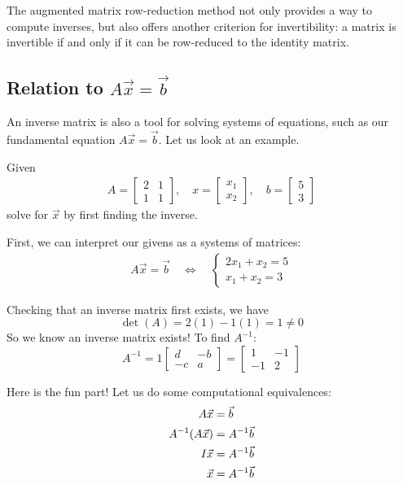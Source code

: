 The augmented matrix row-reduction method not only provides a way to compute inverses, but also offers another criterion for invertibility: 
a matrix is invertible if and only if it can be row-reduced to the identity matrix.
\subsection{Relation to $A\vec{x} = \vec{b}$}
An inverse matrix is also a tool for solving systems of equations, such as our fundamental equation $A\vec{x}=\vec{b}$. Let us look at an example.

Given
$$\begin{array}{c} A =
\begin{bmatrix}
2 & 1 \\
1 & 1
\end{bmatrix},
\quad
x =
\begin{bmatrix}
x_1 \\
x_2
\end{bmatrix},
\quad
b =
\begin{bmatrix}
5 \\
3
\end{bmatrix} \end{array}$$
solve for $\vec{x}$ by first finding the inverse.

First, we can interpret our givens as a systems of matrices:
$$\begin{array}{c} A \vec{x} = \vec{b}
\quad \Longleftrightarrow \quad
\begin{cases}
2x_1 + x_2 = 5 \\
x_1 + x_2 = 3
\end{cases} \end{array}$$

Checking that an inverse matrix first exists, we have
$$\det(A) = 2(1) - 1(1) = 1 \neq 0$$
So we know an inverse matrix exists! To find $A^{-1}$:
$$A^{-1} = 1\begin{bmatrix}d&-b\\-c&a\end{bmatrix}
=
\begin{bmatrix}1&-1\\-1&2\end{bmatrix}$$

Here is the fun part! Let us do some computational equivalences:
\begin{align}
A\vec{x} &= \vec{b} \notag\\
A^{-1}(A\vec{x}) &= A^{-1}\vec{b} \notag\\
I\vec{x} &= A^{-1}\vec{b} \notag\\
\vec{x} &= A^{-1}\vec{b} \label{eq:inv_fundamental}
\end{align}

